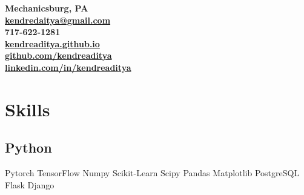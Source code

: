 \documentclass[]{deedy-resume-openfont}
\begin{document}
%
%

%
%
%
%

\begin{minipage}[t]{0.33\textwidth}

\vspace{8pt}



 \bf Mechanicsburg, PA \\
\href{mailto:kendreaditya@gmail.com}{ \bf kendredaitya@gmail.com} \\
 \bf 717-622-1281 \\
\href{https://kendreaditya.github.io/}{ \bf kendreaditya.github.io} \\
\href{https://github.com/kendreaditya}{ \bf github.com/kendreaditya} \\
\href{https://linkedin.com/in/kendreaditya}{ \bf linkedin.com/in/kendreaditya} \\
\vspace{8pt}


\section{Skills}

\subsection{Python}
\location{}
Pytorch \textbullet{} TensorFlow \textbullet{} Numpy \textbullet{}
Scikit-Learn \textbullet{} Scipy \textbullet{} Pandas \textbullet{} 
Matplotlib \textbullet{} PostgreSQL \textbullet{} Flask \textbullet{}
Django


\end{minipage}
\end{document}
